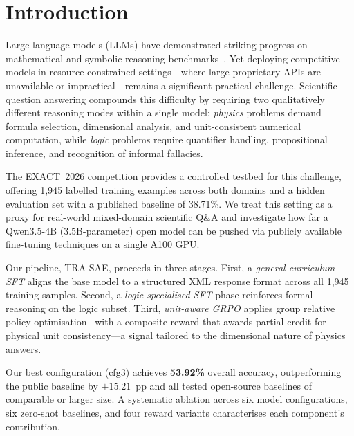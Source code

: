 \documentclass{ieeeaccess}
\newcommand{\modelname}{\textsc{TRA-SAE}}
\newcommand{\basemodelname}{Qwen3.5-4B}
\newcommand{\dataset}{EXACT~2026}
\begin{document}
\titlepgskip=-21pt
\maketitle

\section{Introduction}
\label{sec:intro}

Large language models (LLMs) have demonstrated striking progress on
mathematical and symbolic reasoning
benchmarks~\cite{Wei2022,Kojima2022,Wang2023sc}.
Yet deploying competitive models in resource-constrained settings---where
large proprietary APIs are unavailable or impractical---remains a
significant practical challenge.
Scientific question answering compounds this difficulty by requiring two
qualitatively different reasoning modes within a single model:
\emph{physics} problems demand formula selection, dimensional analysis,
and unit-consistent numerical computation, while \emph{logic} problems
require quantifier handling, propositional inference, and recognition of
informal fallacies.

The \dataset{} competition provides a controlled testbed for this challenge,
offering 1,945 labelled training examples across both domains and a hidden
evaluation set with a published baseline of 38.71\%.
We treat this setting as a proxy for real-world mixed-domain scientific Q\&A
and investigate how far a \basemodelname{} (3.5B-parameter) open model can
be pushed via publicly available fine-tuning techniques on a single A100 GPU.

Our pipeline, \modelname{}, proceeds in three stages.
First, a \emph{general curriculum SFT} aligns the base model to a
structured XML response format across all 1,945 training samples.
Second, a \emph{logic-specialised SFT} phase reinforces formal reasoning
on the logic subset.
Third, \emph{unit-aware GRPO} applies group relative policy
optimisation~\cite{Shao2024} with a composite reward that awards partial
credit for physical unit consistency---a signal tailored to the dimensional
nature of physics answers.

Our best configuration (cfg3) achieves \textbf{53.92\%} overall accuracy,
outperforming the public baseline by $+15.21$~pp and all tested
open-source baselines of comparable or larger size.
A systematic ablation across six model configurations, six zero-shot
baselines, and four reward variants characterises each component's contribution.
\end{document}
